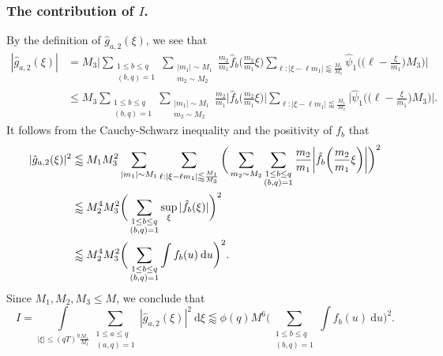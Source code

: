 \documentclass[12pt]{amsart}
\theoremstyle{definition}
\theoremstyle{plain}
\theoremstyle{remark}
\numberwithin{equation}{section}
\numberwithin{theorem}{section}
\numberwithin{equation}{section}
\begin{document}
	\subsubsection{The contribution of $I$.}\label{affTcI}
	By the definition of $\hat{g}_{a,2}(\xi)$, we see that 
	\begin{align*}
		|\hat{g}_{a,2}(\xi)|&=M_3\bigg|\sum_{\substack{1 \leq b \leq q \\ (b, q)=1}}\sum_{\substack{|m_{1}|\sim M_{1} \\ m_{2}\sim M_{2}}} \frac{m_{2}}{m_{1}}\hat{f}_{b}\bigg(\frac{m_{2}}{m_{1}}\xi\bigg) \sum_{\ell: |\xi - \ell m_{1}|\lessapprox \frac{M_{1}}{M_{3}} }\hat{\psi}_{1}\bigg(\bigg(\ell - \frac{\xi}{m_{1}}\bigg)M_{3}\bigg)\bigg| \\
		&\leq M_3\sum_{\substack{1 \leq b \leq q \\ (b, q)=1}}\sum_{\substack{|m_{1}|\sim M_{1} \\ m_{2}\sim M_{2}}} \frac{m_{2}}{m_{1}}\bigg|\hat{f}_{b}\bigg(\frac{m_{2}}{m_{1}}\xi\bigg)\bigg| \sum_{\ell: |\xi - \ell m_{1}|\lessapprox \frac{M_{1}}{M_{3}} }\bigg|\hat{\psi}_{1}\bigg(\bigg(\ell - \frac{\xi}{m_{1}}\bigg)M_{3}\bigg)\bigg|. 
	\end{align*}
	It follows from the Cauchy-Schwarz inequality and the positivity of $f_b$ that
	\begin{align*}
		|\hat{g}_{a,2}(\xi)|^{2}
		&\lessapprox M_{1}M_3^2\sum_{|m_{1}|\sim M_{1}}\sum_{\ell: |\xi - \ell m_{1}|\lessapprox \frac{M_{1}}{M_{3}}}\bigg(\sum_{m_{2}\sim M_{2}}\sum_{\substack{1 \leq b \leq q \\ (b, q)=1}}\frac{m_{2}}{m_{1}}\bigg|\hat{f}_{b}\bigg(\frac{m_{2}}{m_{1}}\xi\bigg)\bigg|\bigg)^{2}
		\notag
		\\
		&\lessapprox M_2^4 M_3^2 \bigg(\sum_{\substack{1 \leq b \leq q \\ (b,q)=1}}  \sup_{\xi} |\hat{f}_b(\xi)| \bigg)^2 \\
		&\lessapprox M_{2}^{4}M_{3}^{2}\bigg(\sum_{\substack{1 \leq b \leq q \\ (b, q)=1}}\int f_{b}(u)\:\mathrm{d}u\bigg)^{2}.
	\end{align*} 
	Since $M_1,M_2,M_3 \leq M$, we conclude that
	\begin{equation}\label{conI}
		I=\int\limits_{|\xi|\leq (qT)^{\eta}\frac{M_{1}}{M_{3}}}\sum_{\substack{1 \leq a \leq q \\ (a, q)=1}}|\hat{g}_{a,2}(\xi)|^{2}\: \mathrm{d} \xi \lessapprox \phi(q)M^{6}\bigg(\sum_{\substack{1 \leq b \leq q \\ (b, q)=1}}\int f_{b}(u)\:\mathrm{d}u\bigg)^{2}.
	\end{equation}
\end{document}
